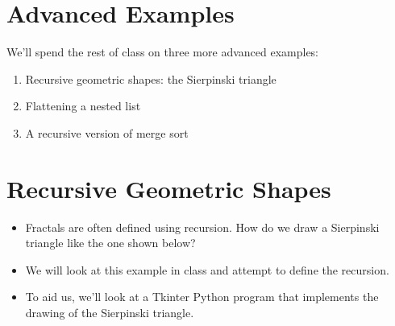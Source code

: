 \documentclass[letterpaper,10pt,english]{sphinxmanual}
\begin{document}
\section{Advanced Examples}
\label{\detokenize{lecture_notes/lec23_recursion:advanced-examples}}
We’ll spend the rest of class on three more advanced examples:
\begin{enumerate}
\item {} 
Recursive geometric shapes:  the Sierpinski triangle

\item {} 
Flattening a nested list

\item {} 
A recursive version of merge sort

\end{enumerate}


\section{Recursive Geometric Shapes}
\label{\detokenize{lecture_notes/lec23_recursion:recursive-geometric-shapes}}\begin{itemize}
\item {} 
Fractals are often defined using recursion. How do we draw a
Sierpinski triangle like the one shown below?

\noindent{}

\item {} 
We will look at this example in class and attempt to define the
recursion.

\item {} 
To aid us, we’ll look at a Tkinter Python program that implements
the drawing of the Sierpinski triangle.

\end{itemize}
\end{document}
